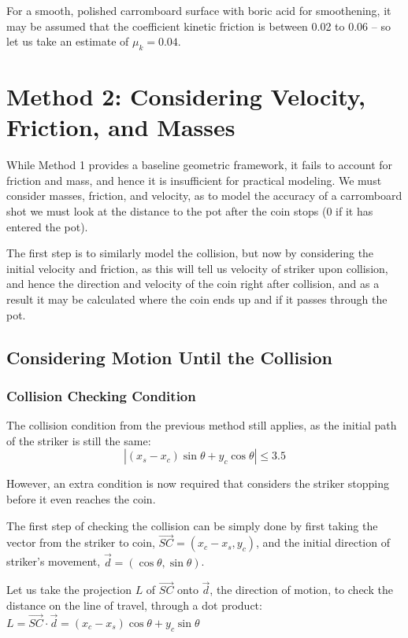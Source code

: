 \documentclass[10pt]{article}
\begin{document}
For a smooth, polished carromboard surface with boric acid for smoothening, it may be assumed that the coefficient kinetic friction is between 0.02 to 0.06 -- so let us take an estimate of $\mu_k = 0.04$. 



\section{Method 2: Considering Velocity, Friction, and Masses} 

While Method 1 provides a baseline geometric framework, it fails to account for friction and mass, and hence it is insufficient for practical modeling. We must consider masses, friction, and velocity, as to model the accuracy of a carromboard shot we must look at the distance to the pot after the coin stops (0 if it has entered the pot). 

The first step is to similarly model the collision, but now by considering the initial velocity and friction, as this will tell us velocity of striker upon collision, and hence the direction and velocity of the coin right after collision, and as a result it may be calculated where the coin ends up and if it passes through the pot.

\subsection{Considering Motion Until the Collision}

\subsubsection{Collision Checking Condition}
The collision condition from the previous method still applies, as the initial path of the striker is still the same:
\[
|(x_s - x_c)\sin\theta+y_c\cos\theta| \leq 3.5
\]

However, an extra condition is now required that considers the striker stopping before it even reaches the coin.

The first step of checking the collision can be simply done by first taking the vector from the striker to coin, $\vec{SC} = (x_c-x_s,y_c)$, and the initial direction of striker's movement, $\vec{d}=(\cos\theta, \sin\theta)$.

Let us take the projection $L$ of $\vec{SC}$ onto $\vec{d}$, the direction of motion, to check the distance on the line of travel, through a dot product: $L = \vec{SC} \cdot \vec{d} = (x_c-x_s)\cos\theta+y_c\sin\theta$
\end{document}
